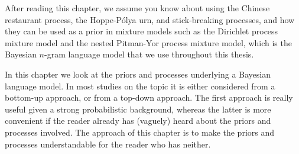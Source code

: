 After reading this chapter, we assume you know about using the Chinese restaurant process, the Hoppe-P\'olya urn, and stick-breaking processes, and how they can be used as a prior in mixture models such as the Dirichlet process mixture model and the nested Pitman-Yor process mixture model, which is the Bayesian $n$-gram language model that we use throughout this thesis.

%


In this chapter we look at the priors and processes underlying a Bayesian language model. In most studies on the topic it is either considered from a bottom-up approach, or from a top-down approach. The first approach is really useful given a strong probabilistic background, whereas the latter is more convenient if the reader already has (vaguely) heard about the priors and processes involved. The approach of this chapter is to make the priors and processes understandable for the reader who has neither.

